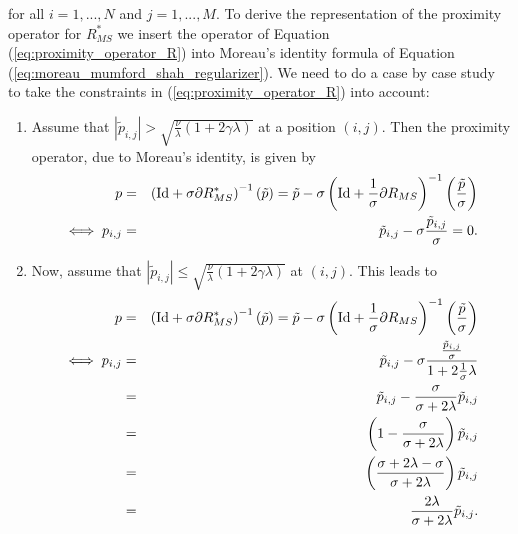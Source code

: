 \documentclass[abstracton]{scrreprt}
\begin{document}
            for all $i = 1, ..., N$ and $j = 1, ..., M$. To derive the representation of the proximity operator for $R_{MS}^{\ast}$ we insert the operator of Equation (\ref{eq:proximity_operator_R}) into Moreau's identity formula of Equation (\ref{eq:moreau_mumford_shah_regularizer}). We need to do a case by case study to take the constraints in (\ref{eq:proximity_operator_R}) into account:
            \begin{enumerate}
                \item Assume that $|\tilde{p}_{i,j}| > \sqrt{\frac{\nu}{\lambda}(1 + 2\gamma\lambda)}$ at a position $(i,j)$. Then the proximity operator, due to Moreau's identity, is given by
                    \begin{eqnarray}
                        p &=& \left( \textnormal{Id} + \sigma \partial R_{MS}^{\ast} \right)^{-1}(\tilde{p}) = \tilde{p} - \sigma \left( \textnormal{Id} + \frac{1}{\sigma} \partial R_{MS} \right)^{-1} \left(\frac{\tilde{p}}{\sigma} \right) \notag \\
                        \iff p_{i,j} &=& \tilde{p}_{i,j} - \sigma \frac{\tilde{p}_{i,j}}{\sigma} = 0. \notag
                    \end{eqnarray}
                \item Now, assume that $|\tilde{p}_{i,j}| \le \sqrt{\frac{\nu}{\lambda}(1 + 2\gamma\lambda)}$ at $(i,j)$. This leads to
                    \begin{eqnarray}
                        p &=& \left( \textnormal{Id} + \sigma \partial R_{MS}^{\ast} \right)^{-1}(\tilde{p}) = \tilde{p} - \sigma \left( \textnormal{Id} + \frac{1}{\sigma} \partial R_{MS} \right)^{-1} \left(\frac{\tilde{p}}{\sigma} \right) \notag \\
                        \iff p_{i,j} &=& \tilde{p}_{i,j} - \sigma \frac{\frac{\tilde{p}_{i,j}}{\sigma}}{1 + 2\frac{1}{\sigma}\lambda} \notag \\
                        &=& \tilde{p}_{i,j} - \frac{\sigma}{\sigma + 2\lambda}\tilde{p}_{i,j} \notag \\
                        &=& \left(1 - \frac{\sigma}{\sigma + 2\lambda}\right) \tilde{p}_{i,j} \notag \\
                        &=& \left(\frac{\sigma + 2\lambda - \sigma}{\sigma + 2\lambda}\right) \tilde{p}_{i,j} \notag \\
                        &=& \frac{2\lambda}{\sigma + 2\lambda} \tilde{p}_{i,j}. \notag
                    \end{eqnarray}
            \end{enumerate}
\end{document}
